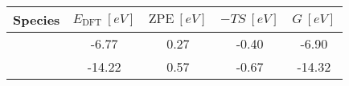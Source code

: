 \begin{table}[!htbp]
\label{tbl:IrO2_gas}
\centering
\footnotesize%
\begin{tabular}{cS[table-format=+.2]S[table-format=.2]S[table-format=+.2]S[table-format=+.2]}
\toprule
Species  & $ {E}_{\mathrm{DFT}}\ [\unit{eV}] $ & $ \mathrm{ZPE}\ [\unit{eV}] $ & $ {-}TS\ [\unit{eV}] $ & $ G\ [\unit{eV}] $ \\
\midrule
{}  &  -6.77                              &  0.27                         &  -0.40                 &  -6.90             \\
 &  -14.22                             &  0.57                         &  -0.67                 &  -14.32            \\
\bottomrule
\end{tabular}
\end{table}
